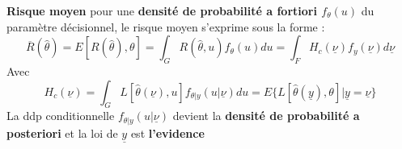 \noindent \textbf{Risque moyen} \newline
\noindent pour une \textbf{densité de probabilité a fortiori $f_{\theta}(u)$} du paramètre décisionnel, le risque moyen s'exprime sous la forme :
\begin{equation}
    \overline{R}(\widehat{\theta}) = E[R(\widehat{\theta}), \theta] = \int_{G}{R(\widehat{\theta},u)}f_{\theta}(u)du = \int_{F}{H_{c}(\underline{\nu})f_{y}(\underline{\nu})}d\underline{\nu}
\end{equation}
Avec
\begin{equation}
    H_{c}(\underline{\nu}) =  \int_{G}{L[\widehat{\theta}(\underline{\nu}), u]f_{\theta | y}(u|\underline{\nu})}du = E\{L[\widehat{\theta}(\underline{y}),\theta]|\underline{y}=\underline{\nu}\}
\end{equation}
La ddp conditionnelle $f_{\theta | y}(u|\underline{\nu})$ devient la \textbf{densité de probabilité a posteriori} et la loi de $\underline{y}$ est \textbf{l'evidence}